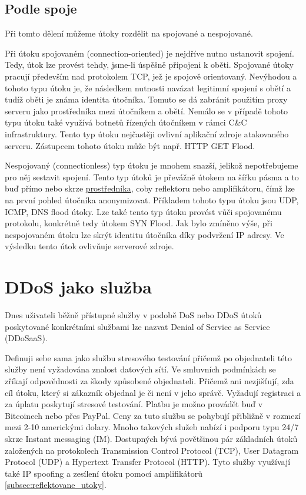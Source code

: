 \subsection{Podle spoje}
Při tomto dělení můžeme útoky rozdělit na spojované a nespojované. 

Při útoku spojovaném (connection-oriented) je nejdříve nutno ustanovit spojení. Tedy, útok lze provést tehdy, jsme-li úspěšně připojeni k oběti. Spojované útoky pracují především nad protokolem TCP, jež je spojově orientovaný. %
Nevýhodou a tohoto typu útoku je, že následkem nutnosti navázat legitimní spojení s obětí a tudíž oběti je známa identita útočníka. Tomuto se dá zabránit použitím proxy serveru jako prostředníka mezi útočníkem a obětí. Nemálo se v případě tohoto typu útoku také využívá botnetů řízených útočníkem v rámci C\&C infrastruktury.
Tento typ útoku nejčastěji ovlivní aplikační zdroje atakovaného serveru.
Zástupcem tohoto útoku může být např. HTTP GET Flood.

Nespojovaný (connectionless) typ útoku je mnohem snazší, jelikož nepotřebujeme pro něj sestavit spojení. Tento typ útoků je převážně útokem na šířku pásma a to buď přímo nebo skrze \hyperref[subsec:zesilene_utoky]{prostředníka}, coby reflektoru nebo amplifikátoru, čímž lze na první pohled útočníka anonymizovat. Příkladem tohoto typu útoku jsou UDP, ICMP, DNS flood útoky. Lze také tento typ útoku provést vůči spojovanému protokolu, konkrétně tedy útokem SYN Flood. Jak bylo zmíněno výše, při nespojovaném útoku lze skrýt identitu útočníka díky podvržení IP adresy. Ve výsledku tento útok ovlivňuje serverové zdroje.

\section{DDoS jako služba}
Dnes uživateli běžně přístupné služby v podobě DoS nebo DDoS útoků poskytované
konkrétními službami lze nazvat Denial of Service as Service (DDoSaaS).

Definuji sebe sama jako službu stresového testování přičemž po objednateli této služby není
vyžadována znalost datových sítí. Ve smluvních podmínkách se zříkají odpovědnosti za škody
způsobené objednateli. Přičemž ani nezjišťují, zda cíl útoku, který si zákazník objednal je či
není v jeho správě. Vyžadují registraci a za úplatu poskytují stresové testování. Platbu je
možno provádět buď v Bitcoinech nebo přes PayPal. Ceny za tuto službu se pohybují přibližně v
rozmezí mezi 2-10 americkými dolary. Mnoho takových služeb nabízí i podporu typu 24/7 skrze
Instant messaging (IM). Dostupných bývá povětšinou pár základních útoků založených na protokolech
Transmission Control Protocol (TCP), User Datagram Protocol (UDP) a Hypertext Transfer Protocol (HTTP). Tyto služby využívají také IP spoofing
a zesílení útoku pomocí amplifikátorů \ref{subsec:reflektovane_utoky}. 

